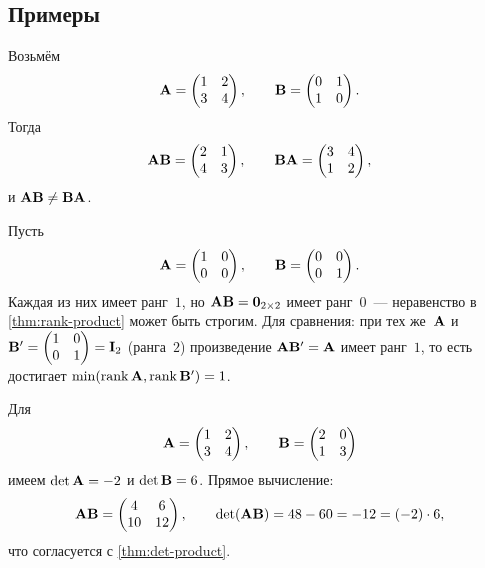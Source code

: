 \subsection*{Примеры}

\begin{example}
\label{ex:noncomm-mult}
Возьмём
\[
  \mathbf{A} = \begin{pmatrix} 1 & 2 \\ 3 & 4 \end{pmatrix}, \qquad
  \mathbf{B} = \begin{pmatrix} 0 & 1 \\ 1 & 0 \end{pmatrix}.
\]
Тогда
\[
  \mathbf{A}\mathbf{B} = \begin{pmatrix} 2 & 1 \\ 4 & 3 \end{pmatrix}, \qquad
  \mathbf{B}\mathbf{A} = \begin{pmatrix} 3 & 4 \\ 1 & 2 \end{pmatrix},
\]
и $\mathbf{A}\mathbf{B} \neq \mathbf{B}\mathbf{A}$.
\end{example}

\begin{example}
\label{ex:rank-product-drop}
Пусть
\[
  \mathbf{A} = \begin{pmatrix} 1 & 0 \\ 0 & 0 \end{pmatrix}, \qquad
  \mathbf{B} = \begin{pmatrix} 0 & 0 \\ 0 & 1 \end{pmatrix}.
\]
Каждая из них имеет ранг~$1$, но
$\mathbf{A}\mathbf{B} = \mathbf{0}_{2 \times 2}$ имеет ранг~$0$~--- неравенство
в \cref{thm:rank-product} может быть строгим. Для сравнения: при
тех же~$\mathbf{A}$ и
$\mathbf{B}' = \begin{pmatrix} 1 & 0 \\ 0 & 1 \end{pmatrix} = \mathbf{I}_2$
(ранга~$2$) произведение $\mathbf{A}\mathbf{B}' = \mathbf{A}$ имеет ранг~$1$,
то есть достигает $\min(\operatorname{rank} \mathbf{A}, \operatorname{rank} \mathbf{B}') = 1$.
\end{example}

\begin{example}
\label{ex:det-product}
Для
\[
  \mathbf{A} = \begin{pmatrix} 1 & 2 \\ 3 & 4 \end{pmatrix}, \qquad
  \mathbf{B} = \begin{pmatrix} 2 & 0 \\ 1 & 3 \end{pmatrix}
\]
имеем $\det \mathbf{A} = -2$ и $\det \mathbf{B} = 6$. Прямое вычисление:
\[
  \mathbf{A}\mathbf{B} = \begin{pmatrix} 4 & 6 \\ 10 & 12 \end{pmatrix},
  \qquad \det(\mathbf{A}\mathbf{B}) = 48 - 60 = -12 = (-2) \cdot 6,
\]
что согласуется с \cref{thm:det-product}.
\end{example}

